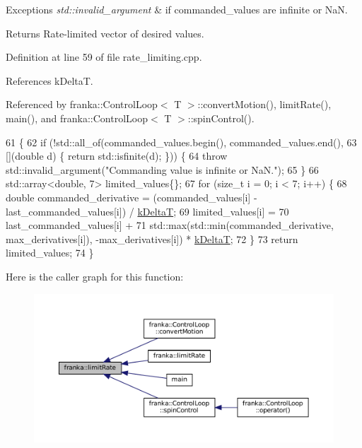 \begin{DoxyExceptions}{Exceptions}
{\em std\+::invalid\+\_\+argument} & if commanded\+\_\+values are infinite or NaN.\\
\hline
\end{DoxyExceptions}
\begin{DoxyReturn}{Returns}
Rate-\/limited vector of desired values. 
\end{DoxyReturn}


Definition at line 59 of file rate\+\_\+limiting.\+cpp.



References k\+DeltaT.



Referenced by franka\+::\+Control\+Loop$<$ T $>$\+::convert\+Motion(), limit\+Rate(), main(), and franka\+::\+Control\+Loop$<$ T $>$\+::spin\+Control().


\begin{DoxyCode}
61                                                                                   \{
62   \textcolor{keywordflow}{if} (!std::all\_of(commanded\_values.begin(), commanded\_values.end(),
63                    [](\textcolor{keywordtype}{double} d) \{ \textcolor{keywordflow}{return} std::isfinite(d); \})) \{
64     \textcolor{keywordflow}{throw} std::invalid\_argument(\textcolor{stringliteral}{"Commanding value is infinite or NaN."});
65   \}
66   std::array<double, 7> limited\_values\{\};
67   \textcolor{keywordflow}{for} (\textcolor{keywordtype}{size\_t} i = 0; i < 7; i++) \{
68     \textcolor{keywordtype}{double} commanded\_derivative = (commanded\_values[i] - last\_commanded\_values[i]) / 
      \hyperlink{namespacefranka_a1e207a0d5a6e90c1e1a78e6e1057120a}{kDeltaT};
69     limited\_values[i] =
70         last\_commanded\_values[i] +
71         std::max(std::min(commanded\_derivative, max\_derivatives[i]), -max\_derivatives[i]) * 
      \hyperlink{namespacefranka_a1e207a0d5a6e90c1e1a78e6e1057120a}{kDeltaT};
72   \}
73   \textcolor{keywordflow}{return} limited\_values;
74 \}
\end{DoxyCode}
Here is the caller graph for this function\+:
\nopagebreak
\begin{figure}[H]
\begin{center}
\leavevmode
\includegraphics[width=350pt]{namespacefranka_a77e127a920da5b0ad29877ec3ff29f15_icgraph}
\end{center}
\end{figure}
\mbox{\label{namespacefranka_a6953f5b41a9fd77389b92b82cf378056}} 
